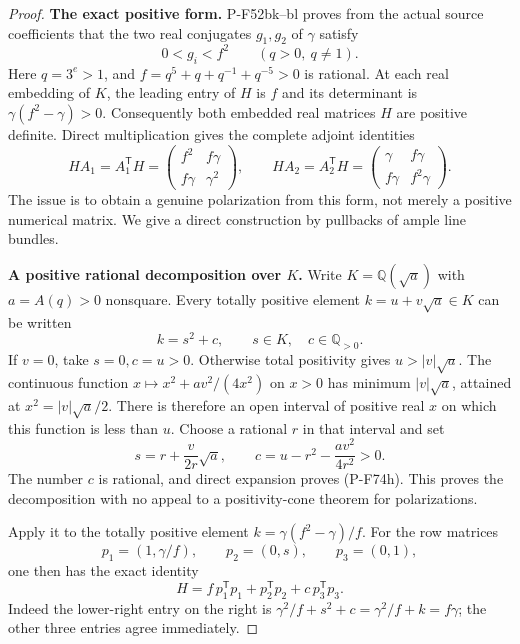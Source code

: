 \begin{proof}
\par\medskip\noindent\textbf{The exact positive form.}
P-F52bk--bl proves from the actual source coefficients that the
two real conjugates $g_1,g_2$ of $\gamma$ satisfy
\[
                       0<g_i<f^2\qquad(q>0,\ q\ne1).
                                                               \tag{P-F74f}
\]
Here $q=3^e>1$, and $f=q^5+q+q^{-1}+q^{-5}>0$ is rational.
At each real embedding of $K$, the leading entry of $H$ is $f$
and its determinant is $\gamma(f^2-\gamma)>0$.
Consequently both embedded real matrices $H$ are positive definite.
Direct multiplication gives the complete adjoint identities
\[
 HA_1=A_1^{\mathsf T}H
       =\begin{pmatrix}f^2&f\gamma\\f\gamma&\gamma^2\end{pmatrix},
 \qquad
 HA_2=A_2^{\mathsf T}H
       =\begin{pmatrix}\gamma&f\gamma\\f\gamma&f^2\gamma\end{pmatrix}.
                                                               \tag{P-F74g}
\]
The issue is to obtain a genuine polarization from this form,
not merely a positive numerical matrix.  We give a direct
construction by pullbacks of ample line bundles.

\par\medskip\noindent\textbf{A positive rational decomposition over $K$.}
Write $K=\mathbb Q(\sqrt a)$ with $a=A(q)>0$ nonsquare.
Every totally positive element $k=u+v\sqrt a\in K$ can be
written
\[
                         k=s^2+c,
              \qquad s\in K,\quad c\in\mathbb Q_{>0}.
                                                               \tag{P-F74h}
\]
If $v=0$, take $s=0,c=u>0$.  Otherwise total positivity gives
$u>|v|\sqrt a$.  The continuous function
$x\mapsto x^2+av^2/(4x^2)$ on $x>0$ has minimum
$|v|\sqrt a$, attained at $x^2=|v|\sqrt a/2$.
There is therefore an open interval of positive real $x$
on which this function is less than $u$.  Choose a rational
$r$ in that interval and set
\[
       s=r+\frac{v}{2r}\sqrt a,\qquad
       c=u-r^2-\frac{av^2}{4r^2}>0.
\]
The number $c$ is rational, and direct expansion proves
(P-F74h).  This proves the decomposition with no appeal
to a positivity-cone theorem for polarizations.

Apply it to the totally positive element
$k=\gamma(f^2-\gamma)/f$.  For the row matrices
\[
 p_1=(1,\gamma/f),\qquad p_2=(0,s),\qquad p_3=(0,1),
\]
one then has the exact identity
\[
       H=f\,p_1^{\mathsf T}p_1+
                    p_2^{\mathsf T}p_2+c\,p_3^{\mathsf T}p_3.
                                                               \tag{P-F74i}
\]
Indeed the lower-right entry on the right is
$\gamma^2/f+s^2+c=\gamma^2/f+k=f\gamma$;
the other three entries agree immediately.


\end{proof}
